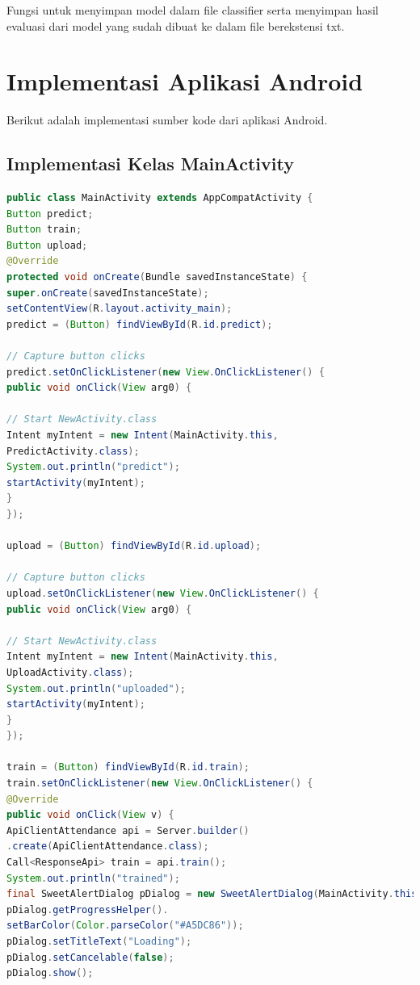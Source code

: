 \par Fungsi untuk menyimpan model dalam file classifier serta menyimpan hasil evaluasi dari model yang sudah dibuat ke dalam file berekstensi txt. 

\section{Implementasi Aplikasi Android}
\par Berikut adalah implementasi sumber kode dari aplikasi Android. 
\subsection{Implementasi Kelas MainActivity}
\begin{lstlisting}[language=Java, caption=Implementasi Kelas Main, label=code:main, firstnumber=23]
public class MainActivity extends AppCompatActivity {
Button predict;
Button train;
Button upload;
@Override
protected void onCreate(Bundle savedInstanceState) {
super.onCreate(savedInstanceState);
setContentView(R.layout.activity_main);
predict = (Button) findViewById(R.id.predict);

// Capture button clicks
predict.setOnClickListener(new View.OnClickListener() {
public void onClick(View arg0) {

// Start NewActivity.class
Intent myIntent = new Intent(MainActivity.this,
PredictActivity.class);
System.out.println("predict");
startActivity(myIntent);
}
});

upload = (Button) findViewById(R.id.upload);

// Capture button clicks
upload.setOnClickListener(new View.OnClickListener() {
public void onClick(View arg0) {

// Start NewActivity.class
Intent myIntent = new Intent(MainActivity.this,
UploadActivity.class);
System.out.println("uploaded");
startActivity(myIntent);
}
});

train = (Button) findViewById(R.id.train);
train.setOnClickListener(new View.OnClickListener() {
@Override
public void onClick(View v) {
ApiClientAttendance api = Server.builder()
.create(ApiClientAttendance.class);
Call<ResponseApi> train = api.train();
System.out.println("trained");
final SweetAlertDialog pDialog = new SweetAlertDialog(MainActivity.this, SweetAlertDialog.PROGRESS_TYPE);
pDialog.getProgressHelper().
setBarColor(Color.parseColor("#A5DC86"));
pDialog.setTitleText("Loading");
pDialog.setCancelable(false);
pDialog.show();


\end{lstlisting}
